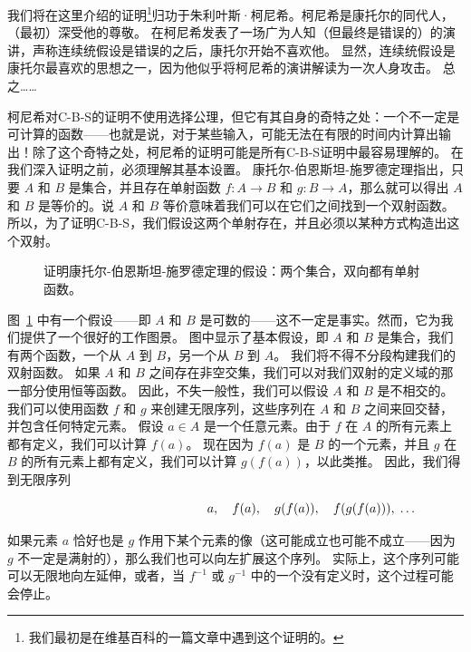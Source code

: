 我们将在这里介绍的证明\footnote{我们最初是在维基百科的一篇文章\cite{wiki-CBS}中遇到这个证明的。}归功于朱利叶斯·柯尼希。柯尼希是康托尔的同代人，（最初）深受他的尊敬。
在柯尼希发表了一场广为人知（但最终是错误的）的演讲，声称连续统假设是错误的之后，康托尔开始不喜欢他。
显然，连续统假设是康托尔最喜欢的思想之一，因为他似乎将柯尼希的演讲解读为一次人身攻击。
总之……

柯尼希对C-B-S的证明不使用选择公理，但它有其自身的奇特之处：一个不一定是可计算的函数——也就是说，对于某些输入，可能无法在有限的时间内计算出输出！除了这个奇特之处，柯尼希的证明可能是所有C-B-S证明中最容易理解的。
在我们深入证明之前，必须理解其基本设置。
康托尔-伯恩斯坦-施罗德定理指出，只要 $A$ 和 $B$ 是集合，并且存在单射函数 $f : A \longrightarrow B$ 和 $g : B \longrightarrow A$，那么就可以得出 $A$ 和 $B$ 是等价的。说 $A$ 和 $B$ 等价意味着我们可以在它们之间找到一个双射函数。所以，为了证明C-B-S，我们假设这两个单射存在，并且必须以某种方式构造出这个双射。

\begin{figure}[!hbtp]
    \begin{center}
        
    \end{center}
    \caption[证明C-B-S定理的设置。]{证明康托尔-伯恩斯坦-施罗德定理的假设：两个集合，双向都有单射函数。}
    \label{fig:CBS_setup}
\end{figure}

图~\ref{fig:CBS_setup} 中有一个假设——即 $A$ 和 $B$ 是可数的——这不一定是事实。然而，它为我们提供了一个很好的工作图景。
图中显示了基本假设，即 $A$ 和 $B$ 是集合，我们有两个函数，一个从 $A$ 到 $B$，另一个从 $B$ 到 $A$。
我们将不得不分段构建我们的双射函数。
如果 $A$ 和 $B$ 之间存在非空交集，我们可以对我们双射的定义域的那一部分使用恒等函数。
因此，不失一般性，我们可以假设 $A$ 和 $B$ 是不相交的。
我们可以使用函数 $f$ 和 $g$ 来创建无限序列，这些序列在 $A$ 和 $B$ 之间来回交替，并包含任何特定元素。
假设 $a \in A$ 是一个任意元素。由于 $f$ 在 $A$ 的所有元素上都有定义，我们可以计算 $f(a)$。
现在因为 $f(a)$ 是 $B$ 的一个元素，并且 $g$ 在 $B$ 的所有元素上都有定义，我们可以计算 $g(f(a))$，以此类推。
因此，我们得到无限序列

\[ \rule{120pt}{0pt} a, \quad  f(a), \quad g(f(a)), \quad f(g(f(a))), \;
    \ldots \]

如果元素 $a$ 恰好也是 $g$ 作用下某个元素的像（这可能成立也可能不成立——因为 $g$ 不一定是满射的），那么我们也可以向左扩展这个序列。
实际上，这个序列可能可以无限地向左延伸，或者，当 $f^{-1}$ 或 $g^{-1}$ 中的一个没有定义时，这个过程可能会停止。

